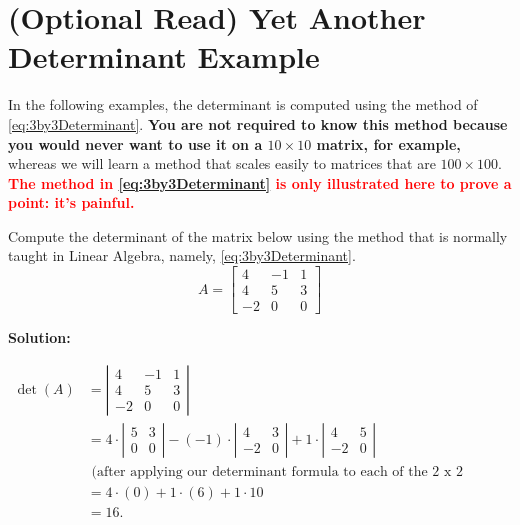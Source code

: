 \section{(Optional Read)  Yet Another Determinant Example}

In the following examples, the determinant is computed using the method of \eqref{eq:3by3Determinant}. \textbf{You are not required to know this method because you would never want to use it on a $10 \times 10$ matrix, for example,} whereas we will learn a method that scales easily to matrices that are $100 \times 100$. \textcolor{red}{\bf The method in \eqref{eq:3by3Determinant} is only illustrated here to prove a point: it's painful.}\\

\begin{example}
Compute the determinant of the matrix below using the method that is normally taught in Linear Algebra, namely, \eqref{eq:3by3Determinant}.
$$A=\left[\begin{array}{rrr} 4 & -1 & 1\\
4 & 5 & 3 \\ -2 & 0 & 0\end{array}\right] $$

\end{example}

\textbf{Solution:}

\begin{align*}
  \det(A) &= \left|\begin{array}{rrr} 4 & -1 & 1\\
4 & 5 & 3 \\ -2 & 0 & 0\end{array}\right| \\
&= 4 \cdot \left|\begin{array}{rr} 
 5 & 3 \\  0 & 0\end{array}\right| -(-1) \cdot \left|\begin{array}{rr} 
 4 & 3 \\  -2 & 0\end{array}\right| + 1 \cdot  \left|\begin{array}{rr} 
 4 & 5 \\  -2 & 0\end{array}\right| \\
 &\text{ (after applying our determinant formula to each of the 2 x 2 matrices above)}\\
 &= 4 \cdot (0) +1 \cdot(6) + 1\cdot 10\\
 &= 16.
\end{align*}

